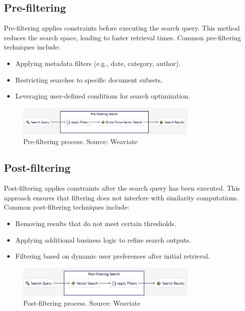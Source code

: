 \subsection{Pre-filtering}
Pre-filtering applies constraints before executing the search query. This method reduces the search space, leading to faster retrieval times. Common pre-filtering techniques include:
\begin{itemize}
    \item Applying metadata filters (e.g., date, category, author).
    \item Restricting searches to specific document subsets.
    \item Leveraging user-defined conditions for search optimization.
\end{itemize}
\begin{figure}[h]
    \centering
\includegraphics[width=0.8\textwidth]{IMAGES/immagine_2025-03-03_093943770.png}
    \caption[Pre-filtering]{Pre-filtering process. Source: Weaviate\footnotemark[1]}
    \label{fig:Rectangle Tree}
\end{figure}
\subsection{Post-filtering}
Post-filtering applies constraints after the search query has been executed. This approach ensures that filtering does not interfere with similarity computations. Common post-filtering techniques include:
\begin{itemize}
    \item Removing results that do not meet certain thresholds.
    \item Applying additional business logic to refine search outputs.
    \item Filtering based on dynamic user preferences after initial retrieval.
\end{itemize}
\begin{figure}[h]
    \centering
\includegraphics[width=0.8\textwidth]{IMAGES/immagine_2025-03-03_094158324.png}
    \caption[Post-filtering]{Post-filtering process. Source: Weaviate\footnotemark[1]}
    \label{fig:Rectangle Tree}
\end{figure}
